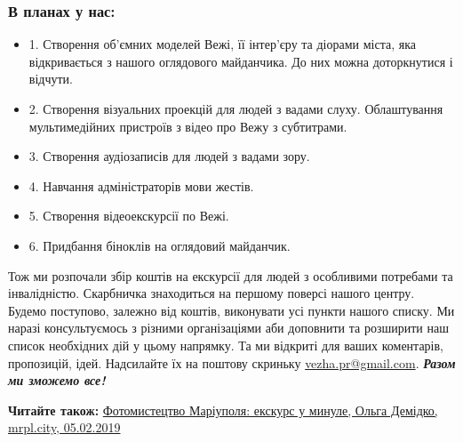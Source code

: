 \subsubsection{В планах у нас:}

\begin{itemize}
	\item 1. Створення об'ємних моделей Вежі, її інтер'єру та діорами міста, яка
	відкривається з нашого оглядового майданчика. До них можна доторкнутися і
	відчути.
  \item 2. Створення візуальних проекцій для людей з вадами слуху. Облаштування мультимедійних пристроїв з відео про Вежу з субтитрами.
  \item 3. Створення аудіозаписів для людей з вадами зору.
  \item 4. Навчання адміністраторів мови жестів.
  \item 5. Створення відеоекскурсії по Вежі.
  \item 6. Придбання біноклів на оглядовий майданчик.
\end{itemize}

Тож ми розпочали збір коштів на екскурсії для людей з особливими потребами та
інвалідністю. Скарбничка знаходиться на першому поверсі нашого центру. Будемо
поступово, залежно від коштів, виконувати усі пункти нашого списку. Ми наразі
консультуємось з різними організаціями аби доповнити та розширити наш список
необхідних дій у цьому напрямку. Та ми відкриті для ваших коментарів,
пропозицій, ідей. Надсилайте їх на поштову скриньку \url{vezha.pr@gmail.com}. \textbf{\emph{Разом
ми зможемо все!}}

\textbf{Читайте також:} \href{https://mrpl.city/blogs/view/fotomistetstvo-mariupolya-ekskurs-u-minule}{%
Фотомистецтво Маріуполя: екскурс у минуле, Ольга Демідко, mrpl.city, 05.02.2019}
